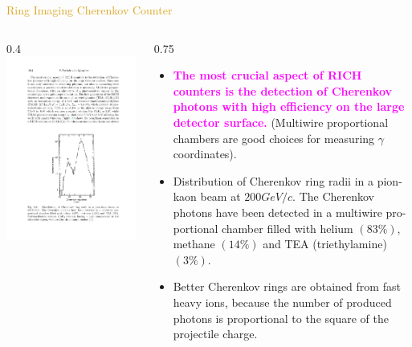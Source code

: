 \documentclass[11pt]{beamer} %
\renewcommand{\(}{\begin{columns}}
\renewcommand{\)}{\end{columns}}
\newcommand{\<}[1]{\begin{column}{#1}}
\renewcommand{\>}{\end{column}}
\newcommand{\itt}{\begin{itemize}}
\newcommand{\tti}{\end{itemize}}
\newcommand{\hlt}[2]{\textcolor{#1}{\textbf{#2}}}
\begin{document}
\begin{frame}{\textcolor{Goldenrod}{Ring Imaging Cherenkov Counter}}
  \(
  \<{0.4\textwidth}
  \includegraphics[width=0.99\textwidth, height=0.85\textwidth]{./Images/RICH_counters_03}
  \>
  \<{0.75\textwidth}
  \itt
\item \hlt{Magenta}{The most crucial aspect of RICH counters is the detection of
  Cherenkov photons with high efficiency on the large detector
  surface.}
  (Multiwire proportional chambers are good choices for measuring $\gamma$ coordinates).
\item Distribution of Cherenkov ring radii in a pion-kaon beam at  
  $200 GeV/c$. The Cherenkov photons have been detected in a multiwire pro-
  portional chamber filled with helium $(83\%)$, methane $(14\%)$ and
  TEA (triethylamine) $(3\%)$.
\item \alert{Better Cherenkov rings are obtained from fast heavy ions, because the
    number of produced photons is proportional to the square of the
    projectile charge.}
  \tti
  \>
  \)
\end{frame} 
\end{document}
